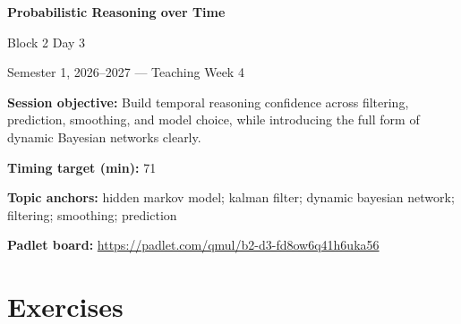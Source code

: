 \documentclass[11pt]{article}
\begin{document}
\begin{center}\LARGE\bfseries Probabilistic Reasoning over Time\end{center}

\begin{center}\large Block 2 Day 3\end{center}

\begin{center}Semester 1, 2026--2027 --- Teaching Week 4\end{center}

\begin{tcolorbox}[colback=MidnightBlue!4,colframe=MidnightBlue,title={Session Overview},fonttitle=\bfseries,breakable]
\textbf{Session objective:} Build temporal reasoning confidence across filtering, prediction, smoothing, and model choice, while introducing the full form of dynamic Bayesian networks clearly.

\textbf{Timing target (min):} 71

\textbf{Topic anchors:} hidden markov model; kalman filter; dynamic bayesian network; filtering; smoothing; prediction

\textbf{Padlet board:} \url{https://padlet.com/qmul/b2-d3-fd8ow6q41h6uka56}
\end{tcolorbox}

\section*{Exercises}
\end{document}
